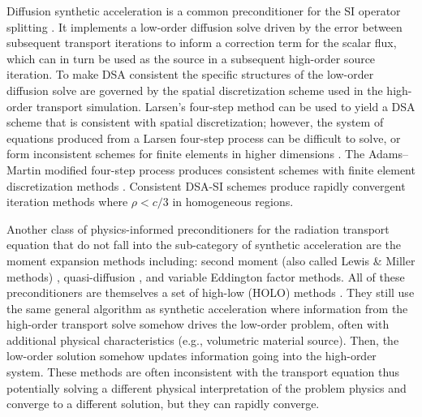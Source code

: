 Diffusion synthetic acceleration is a common preconditioner for the SI operator splitting \cite{adams_fast_2002, alcouffe_1977_dd, coale_2025_dsa}.
It implements a low-order diffusion solve driven by the error between subsequent transport iterations to inform a correction term for the scalar flux, which can in turn be used as the source in a subsequent high-order source iteration.
To make DSA consistent the specific structures of the low-order diffusion solve are governed by the spatial discretization scheme used in the high-order transport simulation.
Larsen's four-step method can be used to yield a DSA scheme that is consistent with spatial discretization; however, the system of equations produced from a Larsen four-step process can be difficult to solve, or form inconsistent schemes for finite elements in higher dimensions \cite{larsen_1982_unconDSA, larsen_1982_unconDSAte, haut_2020_dsa}. 
The Adams--Martin modified four-step process produces consistent schemes with finite element discretization methods \cite{adams_1992_dsadfe}.
Consistent DSA-SI schemes produce rapidly convergent iteration methods where $\rho<c/3$ in homogeneous regions.

Another class of physics-informed preconditioners for the radiation transport equation that do not fall into the sub-category of synthetic acceleration are the moment expansion methods including: second moment (also called Lewis \& Miller methods) \cite{olivier_2024_smoms, lewis_computational_1984, oliver_2025_secondmoment, oliver_phd}, quasi-diffusion \cite{ani_1986_quasidiffusion, goldin_1964_quasidissuion}, and variable Eddington factor \cite{lou_2021_vef, coale_2024_rmomvef} methods.
All of these preconditioners are themselves a set of high-low (HOLO) methods \cite{chacon_2017_holosurvey}.
They still use the same general algorithm as synthetic acceleration where information from the high-order transport solve somehow drives the low-order problem, often with additional physical characteristics (e.g., volumetric material source).
Then, the low-order solution somehow updates information going into the high-order system.
These methods are often inconsistent with the transport equation thus potentially solving a different physical interpretation of the problem physics and converge to a different solution, but they can rapidly converge.

